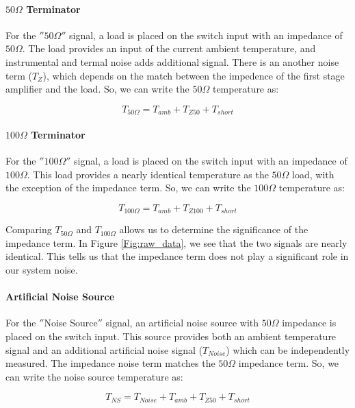 \paragraph{$50 \Omega$ Terminator}
For the $'' 50 \Omega ''$ signal, a load is placed on the switch input with an impedance of $50 \Omega$. The load provides an input of the current ambient temperature, and instrumental and termal noise adds additional signal. There is an another noise term ($T_Z$), which depends on the match between the impedence of the first stage amplifier and the load. So, we can write the $50 \Omega$ temperature as:

\begin{equation}
T_{50 \Omega} = T_{amb}+T_{Z50}+T_{short}
\end{equation}

\paragraph{$100 \Omega$ Terminator}
For the $'' 100 \Omega ''$ signal, a load is placed on the switch input with an impedance of $100 \Omega$. This load provides a nearly identical temperature as the $50 \Omega$ load, with the exception of the impedance term. So, we can write the $100 \Omega$ temperature as:

\begin{equation}
T_{100 \Omega} = T_{amb}+T_{Z100}+T_{short}
\end{equation}

Comparing $T_{50 \Omega}$ and $T_{100 \Omega}$ allows us to determine the significance of the impedance term. In Figure \ref{Fig:raw_data}, we see that the two signals are nearly identical. This tells us that the impedance term does not play a significant role in our system noise.

\paragraph{Artificial Noise Source}
For the $''$Noise Source$''$ signal, an artificial noise source with $50 \Omega$ impedance is placed on the switch input. This source provides both an ambient temperature signal and an additional artificial noise signal ($T_{Noise}$) which can be independently measured. The impedance noise term matches the $50 \Omega$ impedance term. So, we can write the noise source temperature as:

\begin{equation}
T_{NS} = T_{Noise} + T_{amb}+T_{Z50}+T_{short}
\end{equation}


